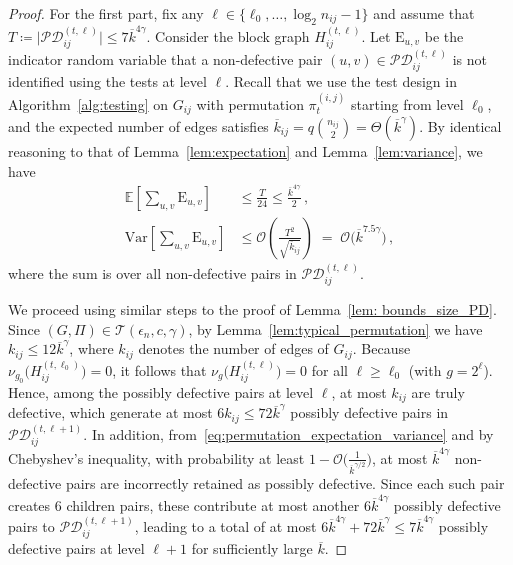 \documentclass[journal]{IEEEtran}
\newcommand{\Var}{\mathrm{Var}}
\theoremstyle{definition}
\theoremstyle{definition}
\newcommand{\Tc}{\mathcal{T}}
\newcommand{\EE}{\mathbb{E}}
\newcommand{\rE}{\mathrm{E}}
\newcommand{\PV}{\nu}
\newcommand{\kb}{\overline{k}}
\newcommand{\bigO}{\mathcal{O}}
\begin{document}
\begin{proof}
For the first part, fix any $\ell \in \{\ell_0,\dots,\log_2 n_{ij}-1\}$ and assume that
$T \coloneqq \bigl|\mathcal{PD}_{ij}^{(t,\ell)}\bigr| \le 7\kb^{4\gamma}$. Consider the block graph $H_{ij}^{(t,\ell)}$. Let $\rE_{u,v}$ be the indicator random variable that a non-defective pair $(u,v) \in \mathcal{PD}_{ij}^{(t,\ell)}$ is not identified using the tests at level $\ell$.  Recall that we use the test design in Algorithm~\ref{alg:testing} on $G_{ij}$ with permutation $\pi_t^{(i,j)}$ starting from level $\ell_0$, and the expected number of edges satisfies $\kb_{ij} = q \binom{n_{ij}}{2} = \Theta(\kb^{\gamma})$. By identical reasoning to that of Lemma~\ref{lem:expectation} and Lemma~\ref{lem:variance}, we have
\begin{equation}
  \label{eq:permutation_expectation_variance}
  \begin{split}
    \EE \left[\sum_{u,v} \rE_{u,v}\right] &\le \frac{T}{24} \le \frac{\kb^{4\gamma}}{2}\,,\\
    \Var \left[\sum_{u,v} \rE_{u,v}\right] &\le \bigO \left(\frac{T^2}{\sqrt{\kb_{ij}}}\right) \;=\; \bigO \big(\kb^{7.5\gamma}\big)\,,
  \end{split}
\end{equation}
where the sum is over all non-defective pairs in $\mathcal{PD}_{ij}^{(t,\ell)}$.

We proceed using similar steps to the proof of Lemma~\ref{lem: bounds_size_PD}. Since $(G,\Pi)\in \Tc(\epsilon_n,c,\gamma)$, by Lemma~\ref{lem:typical_permutation} we have $k_{ij} \le 12\kb^{\gamma}$, where $k_{ij}$ denotes the number of edges of $G_{ij}$. Because $\PV_{g_0} \bigl(H^{(t,\ell_0)}_{ij}\bigr)=0$, it follows that $\PV_{g} \bigl(H^{(t,\ell)}_{ij}\bigr)=0$ for all $\ell \ge \ell_0$ (with $g = 2^{\ell}$). Hence, among the possibly defective pairs at level $\ell$, at most $k_{ij}$ are truly defective, which generate at most $6k_{ij} \le 72\kb^{\gamma}$ possibly defective pairs in $\mathcal{PD}_{ij}^{(t,\ell+1)}$. In addition, from~\eqref{eq:permutation_expectation_variance} and by Chebyshev’s inequality, with probability at least $1-\bigO \big( \tfrac{1}{\kb^{\gamma/2}}\big)$, at most $\kb^{4\gamma}$ non-defective pairs are incorrectly retained as possibly defective.  Since each such pair creates 6 children pairs, these contribute at most another $6\kb^{4\gamma}$ possibly defective pairs to $\mathcal{PD}_{ij}^{(t,\ell+1)}$, leading to a total of at most $6\kb^{4\gamma}+72\kb^{\gamma} \le 7\kb^{4\gamma}$ possibly defective pairs at level $\ell+1$ for sufficiently large $\kb$.


\end{proof}
\end{document}
